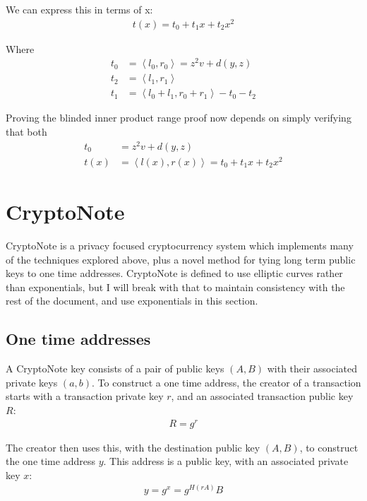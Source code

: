 \documentclass{article}
\begin{document}
We can express this in terms of x:
\begin{align}
  t(x) = t_0 + t_1 x + t_2 x^2
\end{align}

Where
\begin{align}
  t_0 &= \left<l_0, r_0\right> = z^2 v + d(y,z)\\
  t_2 &= \left<l_1, r_1\right>\\
  t_1 &= \left<l_0 + l_1, r_0 + r_1\right> - t_0 - t_2
\end{align}

Proving the blinded inner product range proof now depends on simply verifying that both 
\begin{align}
  t_0 &= z^2 v + d(y,z)\\
  t(x) &= \left<l(x), r(x)\right> = t_0 + t_1 x + t_2 x^2
\end{align}



\section{CryptoNote}

CryptoNote \cite{cryptonote} is a privacy focused cryptocurrency system which implements many of the techniques explored above, plus a novel method for tying long term public keys to one time addresses.  CryptoNote is defined to use elliptic curves rather than exponentials, but I will break with that to maintain consistency with the rest of the document, and use exponentials in this section.


\subsection{One time addresses}

A CryptoNote key consists of a pair of public keys $(A, B)$ with their associated private keys $(a, b)$.  To construct a one time address, the creator of a transaction starts with a transaction private key $r$, and an associated transaction public key $R$:
\begin{align}
  R=g^r
\end{align}

The creator then uses this, with the destination public key $(A, B)$, to construct the one time address $y$.  This address is a public key, with an associated private key $x$:
\begin{align}
  y = g^x = g^{H(rA)} B
\end{align}
\end{document}
